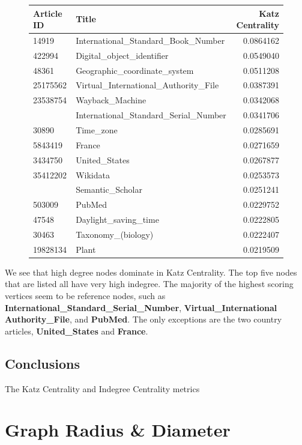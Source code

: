 \documentclass{article}
\begin{document}
\begin{figure}[H]
    \centering
    \begin{tabular}{llr}
        \toprule
        Article ID & Title & Katz Centrality\\
        \midrule
        14919 & International\_Standard\_Book\_Number & 0.0864162\\
        422994 & Digital\_object\_identifier & 0.0549040\\
        48361 & Geographic\_coordinate\_system & 0.0511208\\
        25175562 & Virtual\_International\_Authority\_File & 0.0387391\\
    23538754 & Wayback\_Machine & 0.0342068\\
    \addlinespace
    234930 & International\_Standard\_Serial\_Number & 0.0341706\\
    30890 & Time\_zone & 0.0285691\\
    5843419 & France & 0.0271659\\
    3434750 & United\_States & 0.0267877\\
    35412202 & Wikidata & 0.0253573\\
    \addlinespace
    48455863 & Semantic\_Scholar & 0.0251241\\
    503009 & PubMed & 0.0229752\\
    47548 & Daylight\_saving\_time & 0.0222805\\
    30463 & Taxonomy\_(biology) & 0.0222407\\
    19828134 & Plant & 0.0219509\\
    \bottomrule
    \end{tabular}
\end{figure}

We see that high degree nodes dominate in Katz Centrality.
The top five nodes that are listed all have very high indegree.
The majority of the highest scoring vertices seem to be reference nodes, such as \textbf{International\_Standard\_Serial\_Number}, \textbf{Virtual\_International Authority\_File}, and \textbf{PubMed}.
The only exceptions are the two country articles, \textbf{United\_States} and \textbf{France}.

\subsection{Conclusions}

The Katz Centrality and Indegree Centrality metrics


\section{Graph Radius \& Diameter}
\end{document}
